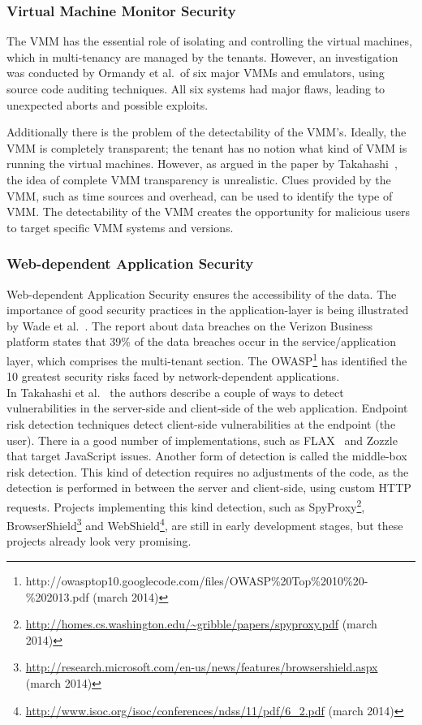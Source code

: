 \subsubsection{Virtual Machine Monitor Security}
The \acl{VMM} has the essential role of isolating and controlling the virtual machines, which in multi-tenancy are managed by the tenants.
However, an investigation was conducted by Ormandy et al.~\cite{Ormandy2007Security}of six major \acp{VMM} and emulators, using source code auditing techniques. All six systems had major flaws, leading to unexpected aborts and possible exploits.

Additionally there is the problem of the detectability of the \ac{VMM}’s. 
Ideally, the \ac{VMM} is completely transparent; the tenant has no notion what kind of \ac{VMM} is running the virtual machines. 
However, as argued in the paper by Takahashi~\cite{Takahashi2012Security}, the idea of complete \ac{VMM} transparency is unrealistic. 
Clues provided by the \ac{VMM}, such as time sources and overhead, can be used to identify the type of \ac{VMM}.
The detectability of the \ac{VMM} creates the opportunity for malicious users to target specific \ac{VMM} systems and versions.

\subsubsection{Web-dependent Application Security}
Web-dependent Application Security ensures the accessibility of the data. 
The importance of good security practices in the application-layer is being illustrated by Wade et al.~\cite{Wade2008Security}.
The report about data breaches on the Verizon Business platform states that 39\% of the data breaches occur in the service/application layer, which comprises the multi-tenant section. The \ac{OWASP}\footnote{http://owasptop10.googlecode.com/files/OWASP\%20Top\%2010\%20-\%202013.pdf (march 2014)} has identified the 10 greatest security risks faced by network-dependent applications.\\

In Takahashi et al.~\cite{Takahashi2012Security} the authors describe a couple of ways to detect vulnerabilities in the server-side and client-side of the web application. 
Endpoint risk detection techniques detect client-side vulnerabilities at the endpoint (the user). 
There ia a good number of implementations, such as FLAX~\cite{saxena10kudzu} and Zozzle~\cite{curtsinger2011zozzle} that target JavaScript issues. 
Another form of detection is called the middle-box risk detection. 
This kind of detection requires no adjustments of the code, as the detection is performed in between the server and client-side, using custom HTTP requests. 
Projects implementing this kind detection, such as SpyProxy\footnote{\url{http://homes.cs.washington.edu/~gribble/papers/spyproxy.pdf} (march 2014)}, BrowserShield\footnote{\url{http://research.microsoft.com/en-us/news/features/browsershield.aspx} (march 2014)} and WebShield\footnote{\url{http://www.isoc.org/isoc/conferences/ndss/11/pdf/6_2.pdf} (march 2014)}, are still in early development stages, but these projects already look very promising.

